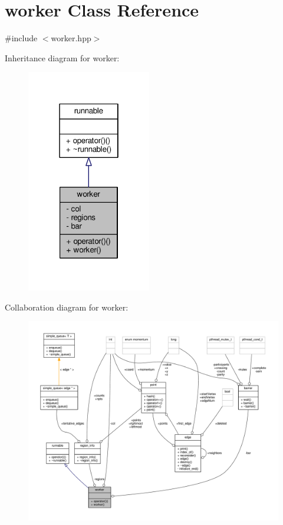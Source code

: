 \hypertarget{classworker}{\section{worker Class Reference}
\label{classworker}
}


{\ttfamily \#include $<$worker.\-hpp$>$}



Inheritance diagram for worker\-:
\nopagebreak
\begin{figure}[H]
\begin{center}
\leavevmode
\includegraphics[width=154pt]{classworker__inherit__graph}
\end{center}
\end{figure}


Collaboration diagram for worker\-:
\nopagebreak
\begin{figure}[H]
\begin{center}
\leavevmode
\includegraphics[width=350pt]{classworker__coll__graph}
\end{center}
\end{figure}

